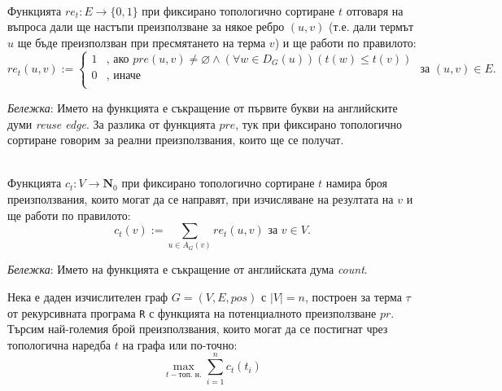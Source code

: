 \documentclass[12pt,twoside,a4paper]{article}
\begin{document}
	\newpage
	\begin{definition}[функцията $re_t$]\label{def:re}~\\
		\indent Функцията $re_t\colon E \to \{0, 1\}$ при фиксирано топологично сортиране $t$ отговаря на въпроса дали ще настъпи преизползване за някое ребро $(u,v)$ (т.е. дали термът $u$ ще бъде преизползван при пресмятането на терма $v$) и ще работи по правилото:
		\begin{equation*}
			re_t(u,v) :=
			\begin{cases}
				1 & \text{, ако }pre(u,v) \neq \varnothing \land (\forall w \in D_G(u))(t(w) \leq t(v))\\
				0 & \text{, иначе}\\
			\end{cases}
			\text{ за }(u,v) \in E.
		\end{equation*}
		
		\textit{Бележка}: Името на функцията е съкращение от първите букви на английските думи \textit{reuse edge}. За разлика от функцията $pre$, тук при фиксирано топологично сортиране говорим за реални преизползвания, които ще се получат.
	\end{definition}
	
	\begin{definition}[функцията $c_t$]\label{def:c}~\\
		\indent Функцията $c_t\colon V \to \mathbf{N}_0$ при фиксирано топологично сортиране $t$ намира броя преизползвания, които могат да се направят, при изчисляване на резултата на $v$ и ще работи по правилото:
		\begin{equation*}
			c_t(v) := \sum_{u \in A_G(v)}{re_t(u,v)}\text{ за } v \in V.
		\end{equation*}
		
		\textit{Бележка}: Името на функцията е съкращение от английската дума \textit{count}.
	\end{definition}
	
	\begin{problem}[целева] Нека е даден изчислителен граф $G=(V,E,pos)$ с $|V|=n$, построен за терма $\tau$ от рекурсивната програма \texttt{R} с функцията на потенциалното преизползване $pr$. Търсим най-големия брой преизползвания, които могат да се постигнат чрез топологична наредба $t$ на графа или по-точно:
		\begin{equation*}
			\max_{t - \text{топ. н.}}{\sum_{i=1}^{n} c_t(t_i)}
		\end{equation*}
	\end{problem}
	
\end{document}
